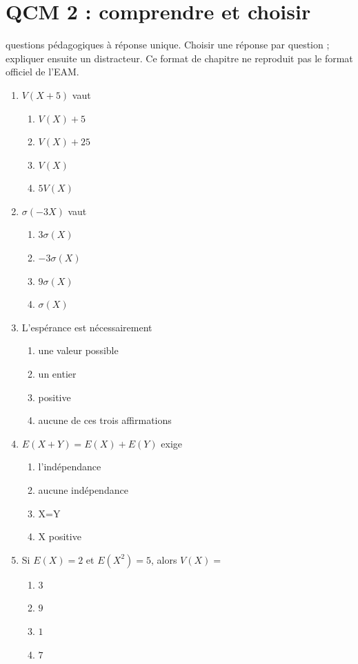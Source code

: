 \endgroup
\begingroup\small
{}\section*{QCM 2 : comprendre et choisir}\label{C08-Q2}
 questions pédagogiques à réponse unique. Choisir une réponse par question ; expliquer ensuite un distracteur. Ce format de chapitre ne reproduit pas le format officiel de l’EAM.
\begin{enumerate}
\item $V(X+5)$ vaut
\begin{enumerate}[label=\Alph*.,itemsep=2pt]
\item $V(X)+5$
\item $V(X)+25$
\item $V(X)$
\item $5V(X)$
\end{enumerate}
\item $\sigma(-3X)$ vaut
\begin{enumerate}[label=\Alph*.,itemsep=2pt]
\item $3\sigma(X)$
\item $-3\sigma(X)$
\item $9\sigma(X)$
\item $\sigma(X)$
\end{enumerate}
\item L’espérance est nécessairement
\begin{enumerate}[label=\Alph*.,itemsep=2pt]
\item une valeur possible
\item un entier
\item positive
\item aucune de ces trois affirmations
\end{enumerate}
\item $E(X+Y)=E(X)+E(Y)$ exige
\begin{enumerate}[label=\Alph*.,itemsep=2pt]
\item l’indépendance
\item aucune indépendance
\item X=Y
\item X positive
\end{enumerate}
\item Si $E(X)=2$ et $E(X^2)=5$, alors $V(X)=$
\begin{enumerate}[label=\Alph*.,itemsep=2pt]
\item $3$
\item $9$
\item $1$
\item $7$
\end{enumerate}
\end{enumerate}
